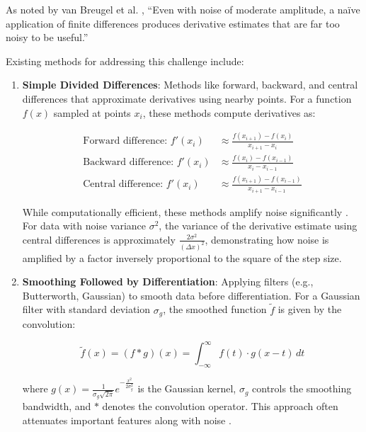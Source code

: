 \documentclass[10pt,journal,compsoc]{IEEEtran}
\begin{document}
As noted by van Breugel et al. \cite{van2021numerical}, ``Even with noise of moderate amplitude, a naïve application of finite differences produces derivative estimates that are far too noisy to be useful.''

Existing methods for addressing this challenge include:

\begin{enumerate}
    \item \textbf{Simple Divided Differences}: Methods like forward, backward, and central differences that approximate derivatives using nearby points. For a function $f(x)$ sampled at points $x_i$, these methods compute derivatives as:
    
    \begin{align}
        \text{Forward difference: } f'(x_i) &\approx \frac{f(x_{i+1}) - f(x_i)}{x_{i+1} - x_i} \\[5pt]
        \text{Backward difference: } f'(x_i) &\approx \frac{f(x_i) - f(x_{i-1})}{x_i - x_{i-1}} \\[5pt]
        \text{Central difference: } f'(x_i) &\approx \frac{f(x_{i+1}) - f(x_{i-1})}{x_{i+1} - x_{i-1}}
    \end{align}
    
    While computationally efficient, these methods amplify noise significantly \cite{kaw2021numerical}. For data with noise variance $\sigma^2$, the variance of the derivative estimate using central differences is approximately $\frac{2\sigma^2}{(\Delta x)^2}$, demonstrating how noise is amplified by a factor inversely proportional to the square of the step size.
    
    \item \textbf{Smoothing Followed by Differentiation}: Applying filters (e.g., Butterworth, Gaussian) to smooth data before differentiation. For a Gaussian filter with standard deviation $\sigma_g$, the smoothed function $\tilde{f}$ is given by the convolution:
    
    \begin{equation}
        \tilde{f}(x) = (f * g)(x) = \int_{-\infty}^{\infty} f(t) \cdot g(x-t) \, dt
    \end{equation}
    
    where $g(x) = \frac{1}{\sigma_g\sqrt{2\pi}}e^{-\frac{x^2}{2\sigma_g^2}}$ is the Gaussian kernel, $\sigma_g$ controls the smoothing bandwidth, and $*$ denotes the convolution operator. This approach often attenuates important features along with noise \cite{ahnert2007numerical}.
    

\end{enumerate}
\end{document}
